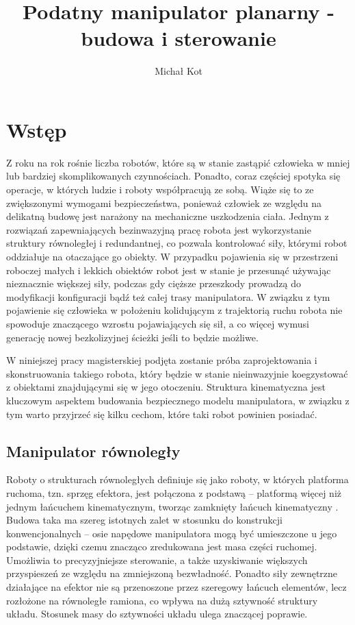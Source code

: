 \documentclass[printmode]{mgr}
\title{Podatny manipulator planarny - budowa i sterowanie}
\author{Michał Kot}
\begin{document}

\maketitle %
\tableofcontents %


\chapter{Wstęp}
Z roku na rok rośnie liczba robotów, które są w stanie zastąpić człowieka w mniej lub bardziej skomplikowanych czynnościach. Ponadto,
coraz częściej spotyka się operacje, w których ludzie i roboty współpracują ze sobą. Wiąże się to ze zwiększonymi wymogami bezpieczeństwa, 
ponieważ człowiek ze względu na delikatną budowę jest narażony na mechaniczne uszkodzenia ciała. Jednym z rozwiązań
zapewniających bezinwazyjną pracę robota jest wykorzystanie struktury równoległej i redundantnej, co pozwala kontrolować siły, którymi
robot oddziałuje na otaczające go obiekty. W przypadku pojawienia się w przestrzeni roboczej małych i lekkich obiektów robot
jest w stanie je przesunąć używając nieznacznie większej siły, podczas gdy cięższe przeszkody prowadzą do modyfikacji
konfiguracji bądź też całej trasy manipulatora. W związku z tym pojawienie się człowieka w położeniu kolidującym z trajektorią ruchu
robota nie spowoduje znaczącego wzrostu pojawiających się sił, a co więcej wymusi generację nowej bezkolizyjnej ścieżki jeśli to będzie możliwe.

W niniejszej pracy magisterskiej podjęta zostanie próba zaprojektowania i skonstruowania takiego robota, który
będzie w stanie nieinwazyjnie koegzystować z obiektami znajdującymi się w jego otoczeniu. Struktura kinematyczna
jest kluczowym aspektem budowania bezpiecznego modelu manipulatora, w związku z tym warto przyjrzeć się kilku
cechom, które taki robot powinien posiadać.

\section{Manipulator równoległy}
Roboty o strukturach równoległych definiuje się jako roboty, w których platforma ruchoma, tzn. sprzęg efektora, jest połączona
z podstawą -- platformą więcej niż jednym łańcuchem kinematycznym, tworząc zamknięty łańcuch kinematyczny \cite{honczarenko}.
Budowa taka ma szereg istotnych zalet w stosunku do konstrukcji konwencjonalnych -- osie napędowe manipulatora
mogą być umieszczone u jego podstawie, dzięki czemu znacząco zredukowana jest masa części ruchomej. Umożliwia to precyzyjniejsze sterowanie,
a także uzyskiwanie większych przyspieszeń ze względu na zmniejszoną bezwładność. Ponadto siły zewnętrzne działające na efektor
nie są przenoszone przez szeregowy łańcuch elementów, lecz rozłożone na równoległe ramiona, co wpływa na dużą sztywność struktury układu.
Stosunek masy do sztywności układu ulega znaczącej poprawie.
\end{document}

